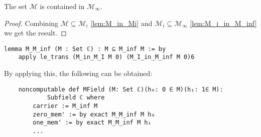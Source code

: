 \begin{lemma}
    The set $\mathcal{M}$ is contained in $\mathcal{M}_{\infty}$.
\end{lemma}

\begin{proof}
    Combining $\mathcal{M} \subseteq \mathcal{M}_i$ \ref{lem:M_in_Mi} and $\mathcal{M}_i \subseteq \mathcal{M}_{\infty}$ \ref{lem:M_i_in_M_inf} we get the result.
\end{proof}

\begin{lstlisting}
lemma M_M_inf (M : Set ℂ) : M ⊆ M_inf M := by 
    apply le_trans (M_in_M_I M 0) (M_I_in_M_inf M 0)6
\end{lstlisting}

By applying this, the following can be obtained:
\begin{lstlisting}
    noncomputable def MField (M: Set ℂ)(h₀: 0 ∈ M)(h₁: 1∈ M): 
            Subfield ℂ where
        carrier := M_inf M
        zero_mem' := by exact M_M_inf M h₀
        one_mem' := by exact M_M_inf M h₁
        ...
\end{lstlisting}